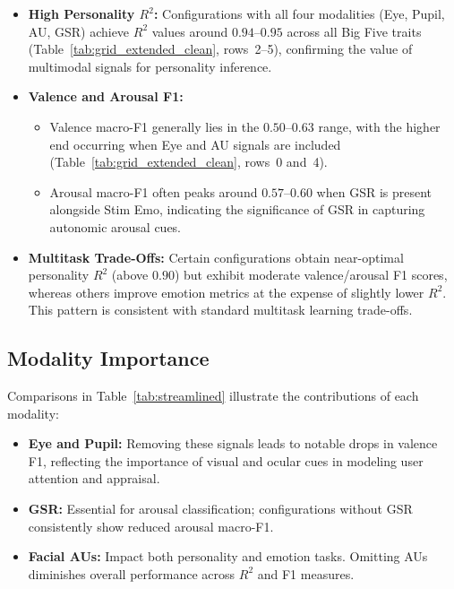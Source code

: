 \documentclass[sigconf]{acmart}
\begin{document}
\begin{itemize}
    \item \textbf{High Personality $R^2$:}
    Configurations with all four modalities (Eye, Pupil, AU, GSR) achieve $R^2$ values around $0.94$–$0.95$ across all Big Five traits (Table~\ref{tab:grid_extended_clean}, rows~2–5), confirming the value of multimodal signals for personality inference.

    \item \textbf{Valence and Arousal F1:}
    \begin{itemize}
        \item Valence macro-F1 generally lies in the $0.50$–$0.63$ range, with the higher end occurring when Eye and AU signals are included (Table~\ref{tab:grid_extended_clean}, rows~0 and~4).
        \item Arousal macro-F1 often peaks around $0.57$–$0.60$ when GSR is present alongside Stim Emo, indicating the significance of GSR in capturing autonomic arousal cues.
    \end{itemize}

    \item \textbf{Multitask Trade-Offs:}
    Certain configurations obtain near-optimal personality $R^2$ (above $0.90$) but exhibit moderate valence/arousal F1 scores, whereas others improve emotion metrics at the expense of slightly lower $R^2$. This pattern is consistent with standard multitask learning trade-offs.
\end{itemize}

\subsection{Modality Importance}

Comparisons in Table~\ref{tab:streamlined} illustrate the contributions of each modality:

\begin{itemize}
    \item \textbf{Eye and Pupil:} 
    Removing these signals leads to notable drops in valence F1, reflecting the importance of visual and ocular cues in modeling user attention and appraisal.
    \item \textbf{GSR:} 
    Essential for arousal classification; configurations without GSR consistently show reduced arousal macro-F1.
    \item \textbf{Facial AUs:} 
    Impact both personality and emotion tasks. Omitting AUs diminishes overall performance across $R^2$ and F1 measures.
\end{itemize}
\end{document}
